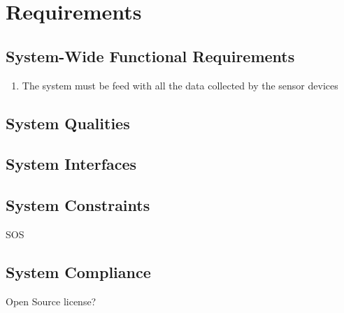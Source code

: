 \chapter{Requirements}

\section{System-Wide Functional Requirements}

\begin{enumerate}
	\item The system must be feed with all the data collected by the sensor devices
\end{enumerate}

\section{System Qualities}

\section{System Interfaces}

\section{System Constraints}

SOS

\section{System Compliance}

Open Source license?


